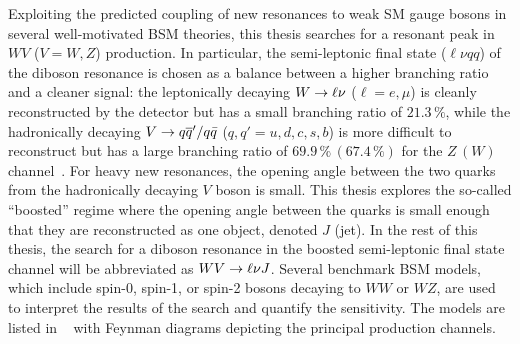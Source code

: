 Exploiting the predicted coupling of new resonances to weak SM gauge bosons in several well-motivated BSM theories, this thesis searches for a resonant peak in $WV$ ($V=W,Z$) production. In particular, the semi-leptonic final state ($\ell\nu qq$) of the diboson resonance is chosen as a balance between a higher branching ratio and a cleaner signal: the leptonically decaying $W\rightarrow \ell\nu$ ($\ell = e, \mu$) is cleanly reconstructed by the detector but has a small branching ratio of $21.3\,\%$, while the hadronically decaying $V\rightarrow q\overline{q}'/q\bar{q}$ ($q,q'=u,d,c,s,b$) is more difficult to reconstruct but has a large branching ratio of $69.9\,\%\, (67.4\,\%)$ for the $Z\, (W)$ channel~\cite{pdg_2017}.
For heavy new resonances, the opening angle between the two quarks from the hadronically decaying $V$ boson is small.  This thesis explores the so-called ``boosted'' regime where the opening angle between the quarks is small enough that they are reconstructed as one object, denoted $J$ (jet). In the rest of this thesis, the search for a diboson resonance in the boosted semi-leptonic final state channel will be abbreviated as $WV\rightarrow \ell\nu J$.
Several benchmark BSM models, which include spin-0, spin-1, or spin-2 bosons decaying to $WW$ or $WZ$, are used to interpret the results of the search and quantify the sensitivity. The models are listed in ~\Tab{\ref{tab:bench_models}} with Feynman diagrams depicting the principal production channels. 

